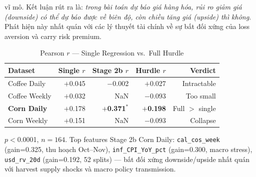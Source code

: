 \documentclass[conference]{IEEEtran}
\begin{document}
vĩ mô.
Kết luận rút ra là: \emph{trong bài toán dự báo giá hàng hóa, rủi ro giảm giá
(downside) có thể dự báo được về biên độ, còn chiều tăng giá (upside) thì
không}. Phát hiện này nhất quán với các lý thuyết tài chính về sự bất đối
xứng của loss aversion và carry risk premium.
\begin{table}[t]
\caption{Pearson $r$ --- Single Regression vs.\ Full Hurdle}
\label{tab:hurdle}
\centering
\begin{tabular}{@{}lrrrr@{}}
\toprule
\textbf{Dataset} & \textbf{Single $r$} & \textbf{Stage 2b $r$} & \textbf{Hurdle $r$} & \textbf{Verdict} \\
\midrule
Coffee Daily  & $+$0.045 & $-$0.002 & $+$0.027 & Intractable \\
Coffee Weekly & $+$0.032 & NaN & $-$0.093 & Too small \\
\textbf{Corn Daily} & $+$0.178 & $+$\textbf{0.371}$^*$ & $+$\textbf{0.198} & Full $>$ single \\
Corn Weekly   & $+$0.151 & NaN & $-$0.093 & Collapse \\
\bottomrule
\end{tabular}
\begin{tablenotes}
\footnotesize
\item[*] $p<$0.0001, $n=164$. Top features Stage 2b Corn Daily:
\texttt{cal\_cos\_week} (gain=0.325, thu hoạch Oct--Nov),
\texttt{inf\_CPI\_YoY\_pct} (gain=0.300, macro stress),
\texttt{usd\_rv\_20d} (gain=0.192, 52 splits) ---
bất đối xứng downside/upside nhất quán với harvest supply shocks
và macro policy transmission.
\end{tablenotes}
\end{table}
\end{document}
